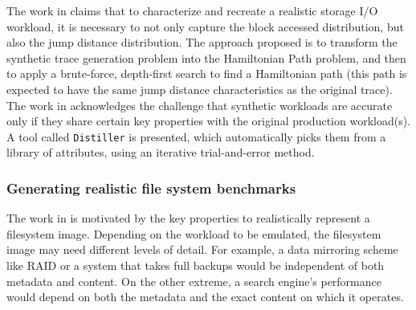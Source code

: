 The work in \cite{jump-based-synthetic} claims that to characterize
and recreate a realistic storage I/O workload, it is necessary to not
only capture the block accessed distribution, but also the jump distance
distribution. The approach proposed is to transform the synthetic 
trace generation problem into the
Hamiltonian Path problem, and then to apply a brute-force, depth-first
search to find a Hamiltonian path (this path is expected to have the
same jump distance characteristics as the original trace).
The work in \cite{distiller} acknowledges the challenge that synthetic
workloads are accurate only if they share certain key properties
with the original production workload(s). 
A tool called \texttt{Distiller} is presented, which automatically picks
them from a library of attributes, using an iterative trial-and-error method. 

%

\subsubsection{Generating realistic file system benchmarks}
The work in \cite{impressions} is motivated by
the key properties to realistically represent a filesystem
image. Depending on the workload to
be emulated, the filesystem image may
need different levels of detail. For example, a data mirroring
scheme like RAID or a system that takes full backups would be
independent of both metadata and content.
On the other extreme, a search engine's performance
would depend on both the metadata and the exact content
on which it operates.

